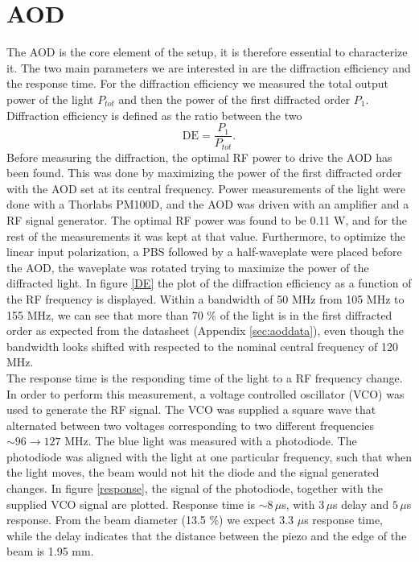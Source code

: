 \section{AOD}
\label{sec:resultaod}
The AOD is the core element of the setup, it is therefore essential to characterize it. The two main parameters we are interested in are the diffraction efficiency and the response time. For the diffraction efficiency we measured the total output power of the light $P_{tot}$ and then the power of the first diffracted order $P_{1}$. Diffraction efficiency is defined as the ratio between the two
\begin{equation}
\text{DE} = \frac{P_1}{P_{tot}}.
\end{equation}
Before measuring the diffraction, the optimal RF power to drive the AOD has been found. This was done by maximizing the power of the first diffracted order with the AOD set at its central frequency. Power measurements of the light were done with a Thorlabs PM100D, and the AOD was driven with an amplifier and a RF signal generator. The optimal RF power was found to be 0.11 W, and for the rest of the measurements it was kept at that value. Furthermore, to optimize the linear input polarization, a PBS followed by a half-waveplate were placed before the AOD, the waveplate was rotated trying to maximize the power of the diffracted light. In figure \ref{DE} the plot of the diffraction efficiency as a function of the RF frequency is displayed. Within a bandwidth of 50 MHz from 105 MHz to 155 MHz, we can see that more than 70 \% of the light is in the first diffracted order as expected from the datasheet (Appendix \ref{sec:aoddata}), even though the bandwidth looks shifted with respected to the nominal central frequency of 120 MHz.\\
The response time is the responding time of the light to a RF frequency change. In order to perform this measurement, a voltage controlled oscillator (VCO) was used to generate the RF signal. The VCO was supplied a square wave that alternated between two voltages corresponding to two different frequencies $\sim 96 \to 127$ MHz. The blue light was measured with a photodiode. The photodiode was aligned with the light at one particular frequency, such that when the light moves, the beam would not hit the diode and the signal generated changes. In figure \ref{response}, the signal of the photodiode, together with the supplied VCO signal are plotted. Response time is $\sim 8\,\mu$s, with $3\,\mu$s delay and $5\,\mu$s response. From the beam diameter (13.5 \%) we expect 3.3 $\mu$s response time, while the delay indicates that the distance between the piezo and the edge of the beam is 1.95 mm.

